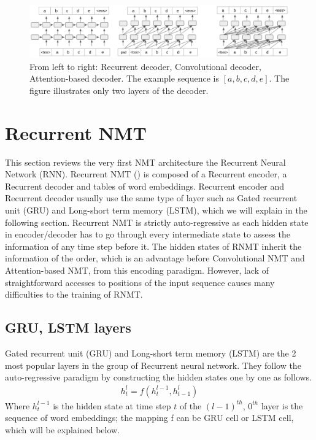 \begin{figure}[htbp]
\includegraphics[width=\textwidth]{graphics/multi_layer_decoder.png}
\caption[Illustration of 3 most popular multi-layer auto-regressive decoding paradigms]{From left to right: Recurrent decoder, Convolutional decoder, Attention-based decoder. The example sequence is $[a,b,c,d,e]$. The figure illustrates only two layers of the decoder.}
\label{fig:decoding}
\end{figure}

\section{Recurrent NMT} \label{sec:rrn}
This section reviews the very first NMT architecture the Recurrent Neural Network (RNN). Recurrent NMT () is composed of a Recurrent encoder, a Recurrent decoder and tables of word embeddings. Recurrent encoder and Recurrent decoder usually use the same type of layer such as Gated recurrent unit (GRU) and Long-short term memory (LSTM), which we will explain in the following section. Recurrent NMT is strictly auto-regressive as each hidden state in encoder/decoder has to go through every intermediate state to assess the information of any time step before it. The hidden states of RNMT inherit the information of the order, which is an advantage before Convolutional NMT and Attention-based NMT, from this encoding paradigm. However, lack of straightforward accesses to positions of the input sequence causes many difficulties to the training of RNMT.

\subsection{GRU, LSTM layers}
Gated recurrent unit (GRU) and Long-short term memory (LSTM) are the 2 most popular layers in the group of Recurrent neural network. They follow the auto-regressive paradigm by constructing the hidden states one by one as follows.
\begin{equation}
\begin{array}{rcl}
h^l_t = f(h^{l-1}_t, h^l_{t-1})
\end{array}
\end{equation}
Where $h^{l-1}_t$ is the hidden state at time step $t$ of the $(l-1)^{th}$, $0^{th}$ layer is the sequence of word embeddings; the mapping f can be GRU cell or LSTM cell, which will be explained below.


